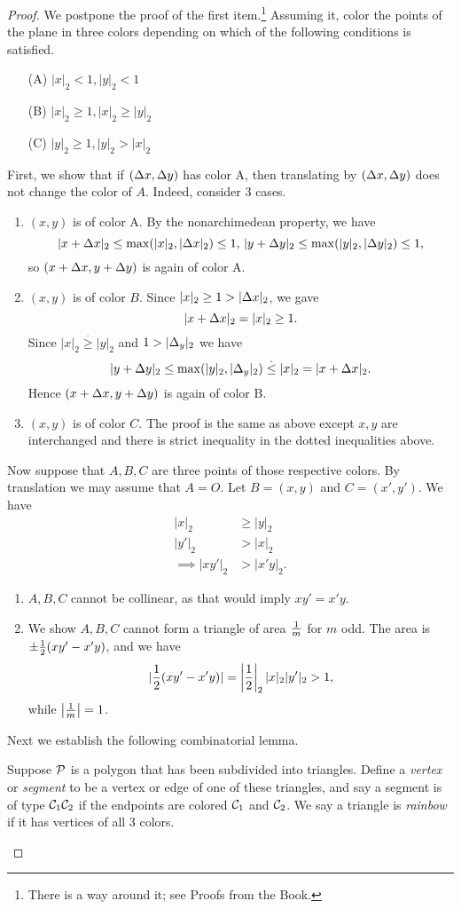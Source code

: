 \begin{proof}
We postpone the proof of the first item.\footnote{There is a way around it; see Proofs from the Book.} Assuming it, 
color the points of the plane in three colors depending on which of the following conditions is satisfied.
\begin{enumerate}
\item[(A)] $|x|_2<1,|y|_2<1$
\item[(B)] $|x|_2\ge 1,|x|_2\ge |y|_2$
\item[(C)] $|y|_2\ge 1,|y|_2> |x|_2$
\end{enumerate}
First, we show that if $(\De x,\De y)$ has color A, then translating by $(\De x,\De y)$ does not change the color of $A$. Indeed, consider 3 cases.
\begin{enumerate}
\item
$(x,y)$ is of color A. By the nonarchimedean property, we have
\[
|x+\De x|_2\le \max(|x|_2,|\De x|_2)\le 1, \,
|y+\De y|_2\le \max(|y|_2,|\De y|_2)\le 1,
\]
so $(x+\De x,y+\De y)$ is again of color A.
\item
$(x,y)$ is of color $B$. Since $|x|_2\ge 1>|\De x|_2$, we gave
\[
|x+\De x|_2=|x|_2\ge 1.
\]
Since $|x|_2\stackrel{.}{\ge} |y|_2$ and $1>|\De_y|_2$ we have
\[
|y+\De y|_2\le \max(|y|_2,|\De_y|_2)\stackrel{.}{\le} |x|_2=|x+\De x|_2.
\]
Hence $(x+\De x,y+\De y)$ is again of color B.
\item
$(x,y)$ is of color $C$. The proof is the same as above except $x,y$ are interchanged and there is strict inequality in the dotted inequalities above.
\end{enumerate}
Now suppose that $A,B,C$ are three points of those respective colors. By translation we may assume that $A=O$. Let $B=(x,y)$ and $C=(x',y')$. We have
\begin{align*}
|x|_2&\ge |y|_2\\
|y'|_2&> |x|_2\\
\implies |xy'|_2&>|x'y|_2.
\end{align*}
\begin{enumerate}
\item
$A,B,C$ cannot be collinear, as that would imply $xy'=x'y$.
\item
We show $A,B,C$ cannot form a triangle of area $\rc m$ for $m$ odd. The area is $\pm \rc 2(xy'-x'y)$, and we have
\[
|\rc 2 (xy'-x'y)|=\ab{\rc 2}_2|x|_2|y'|_2>1,
\]
while $\ab{\rc m}=1$.
\end{enumerate}
Next we establish the following combinatorial lemma.
\begin{lem}
Suppose $\cal P$ is a polygon that has been subdivided into triangles.
Define a {\it vertex} or {\it segment} to be a vertex or edge of one of these triangles, and say a segment is of type $\cal C_1\cal C_2$ if the endpoints are colored $\cal C_1$ and $\cal C_2$. We say a triangle is {\it rainbow} if it has vertices of all 3 colors.


\end{lem}
\end{proof}
